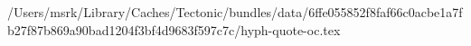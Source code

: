 /Users/msrk/Library/Caches/Tectonic/bundles/data/6ffe055852f8faf66c0acbe1a7fb27f87b869a90bad1204f3bf4d9683f597c7c/hyph-quote-oc.tex